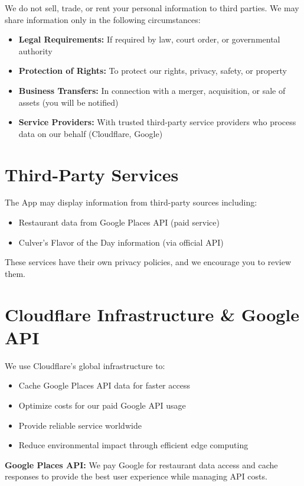 \documentclass[11pt,letterpaper]{article}
\begin{document}
We do not sell, trade, or rent your personal information to third parties. We may share information only in the following circumstances:
\begin{itemize}
    \item \textbf{Legal Requirements:} If required by law, court order, or governmental authority
    \item \textbf{Protection of Rights:} To protect our rights, privacy, safety, or property
    \item \textbf{Business Transfers:} In connection with a merger, acquisition, or sale of assets (you will be notified)
    \item \textbf{Service Providers:} With trusted third-party service providers who process data on our behalf (Cloudflare, Google)
\end{itemize}

\section{Third-Party Services}

The App may display information from third-party sources including:
\begin{itemize}
    \item Restaurant data from Google Places API (paid service)
    \item Culver's Flavor of the Day information (via official API)
\end{itemize}

These services have their own privacy policies, and we encourage you to review them.

\section{Cloudflare Infrastructure \& Google API}
We use Cloudflare's global infrastructure to:
\begin{itemize}
    \item Cache Google Places API data for faster access
    \item Optimize costs for our paid Google API usage
    \item Provide reliable service worldwide
    \item Reduce environmental impact through efficient edge computing
\end{itemize}

\textbf{Google Places API:} We pay Google for restaurant data access and cache responses to provide the best user experience while managing API costs.
\end{document}
